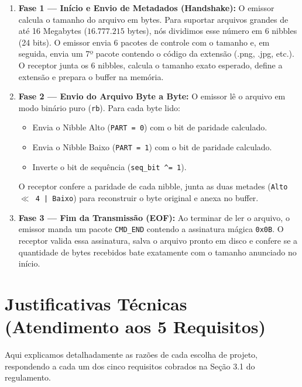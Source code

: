 \documentclass[12pt,a4paper]{article}
\begin{document}
\begin{enumerate}[leftmargin=*]
    \item \textbf{Fase 1 --- Início e Envio de Metadados (Handshake):}
    O emissor calcula o tamanho do arquivo em bytes. Para suportar arquivos grandes de até 16 Megabytes ($16.777.215$ bytes), nós dividimos esse número em 6 nibbles (24 bits). O emissor envia 6 pacotes de controle com o tamanho e, em seguida, envia um 7º pacote contendo o código da extensão (.png, .jpg, etc.). O receptor junta os 6 nibbles, calcula o tamanho exato esperado, define a extensão e prepara o buffer na memória.
    
    \item \textbf{Fase 2 --- Envio do Arquivo Byte a Byte:}
    O emissor lê o arquivo em modo binário puro (\texttt{rb}). Para cada byte lido:
    \begin{itemize}
        \item Envia o Nibble Alto (\texttt{PART = 0}) com o bit de paridade calculado.
        \item Envia o Nibble Baixo (\texttt{PART = 1}) com o bit de paridade calculado.
        \item Inverte o bit de sequência (\texttt{seq\_bit \^{}= 1}).
    \end{itemize}
    O receptor confere a paridade de cada nibble, junta as duas metades (\texttt{Alto $\ll$ 4 | Baixo}) para reconstruir o byte original e anexa no buffer.
    
    \item \textbf{Fase 3 --- Fim da Transmissão (EOF):}
    Ao terminar de ler o arquivo, o emissor manda um pacote \texttt{CMD\_END} contendo a assinatura mágica \texttt{0x0B}. O receptor valida essa assinatura, salva o arquivo pronto em disco e confere se a quantidade de bytes recebidos bate exatamente com o tamanho anunciado no início.
\end{enumerate}

\section{Justificativas Técnicas (Atendimento aos 5 Requisitos)}

Aqui explicamos detalhadamente as razões de cada escolha de projeto, respondendo a cada um dos cinco requisitos cobrados na Seção 3.1 do regulamento.
\end{document}

